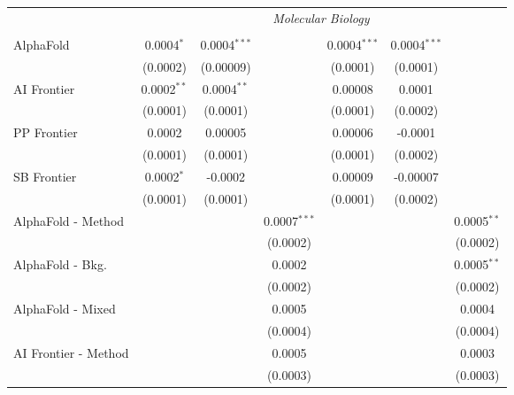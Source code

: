 \begin{tabular}{lcccccc}
 & \multicolumn{6}{c}{\textit{Molecular Biology}} \\ \\
   AlphaFold            & 0.0004$^{*}$  & 0.0004$^{***}$ &                & 0.0004$^{***}$ & 0.0004$^{***}$ &   \\   
                        & (0.0002)      & (0.00009)      &                & (0.0001)       & (0.0001)       &   \\   
   AI Frontier          & 0.0002$^{**}$ & 0.0004$^{**}$  &                & 0.00008        & 0.0001         &   \\   
                        & (0.0001)      & (0.0001)       &                & (0.0001)       & (0.0002)       &   \\   
   PP Frontier          & 0.0002        & 0.00005        &                & 0.00006        & -0.0001        &   \\   
                        & (0.0001)      & (0.0001)       &                & (0.0001)       & (0.0002)       &   \\   
   SB Frontier          & 0.0002$^{*}$  & -0.0002        &                & 0.00009        & -0.00007       &   \\   
                        & (0.0001)      & (0.0001)       &                & (0.0001)       & (0.0002)       &   \\   
   AlphaFold - Method   &               &                & 0.0007$^{***}$ &                &                & 0.0005$^{**}$\\   
                        &               &                & (0.0002)       &                &                & (0.0002)\\   
   AlphaFold - Bkg.     &               &                & 0.0002         &                &                & 0.0005$^{**}$\\   
                        &               &                & (0.0002)       &                &                & (0.0002)\\   
   AlphaFold - Mixed    &               &                & 0.0005         &                &                & 0.0004\\   
                        &               &                & (0.0004)       &                &                & (0.0004)\\   
   AI Frontier - Method &               &                & 0.0005         &                &                & 0.0003\\   
                        &               &                & (0.0003)       &                &                & (0.0003)\\   

\end{tabular}
